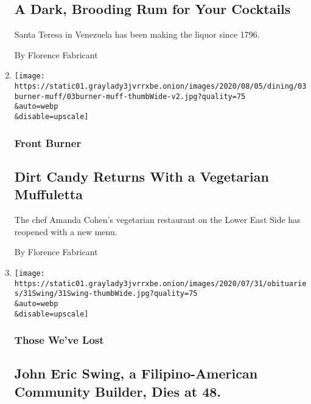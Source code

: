 \begin{enumerate}
  \hypertarget{a-dark-brooding-rum-for-your-cocktails}{%
  \subsection{A Dark, Brooding Rum for Your
  Cocktails}\label{a-dark-brooding-rum-for-your-cocktails}}

  Santa Teresa in Venezuela has been making the liquor since 1796.

  By Florence Fabricant
\item
  \href{/2020/08/03/dining/dirt-candy-vegetarian-muffuletta.html}{}

  \texttt{[image: https://static01.graylady3jvrrxbe.onion/images/2020/08/05/dining/03burner-muff/03burner-muff-thumbWide-v2.jpg?quality=75\\\&auto=webp\\\&disable=upscale]}

  \hypertarget{front-burner-6}{%
  \subsubsection{Front Burner}\label{front-burner-6}}

  \hypertarget{dirt-candy-returns-with-a-vegetarian-muffuletta}{%
  \subsection{Dirt Candy Returns With a Vegetarian
  Muffuletta}\label{dirt-candy-returns-with-a-vegetarian-muffuletta}}

  The chef Amanda Cohen's vegetarian restaurant on the Lower East Side
  has reopened with a new menu.

  By Florence Fabricant
\item
  \href{/2020/08/03/obituaries/john-swing-dead-coronavirus.html}{}

  \texttt{[image: https://static01.graylady3jvrrxbe.onion/images/2020/07/31/obituaries/31Swing/31Swing-thumbWide.jpg?quality=75\\\&auto=webp\\\&disable=upscale]}

  \hypertarget{those-weve-lost}{%
  \subsubsection{Those We've Lost}\label{those-weve-lost}}

  \hypertarget{john-eric-swing-a-filipino-american-community-builder-dies-at-48}{%
  \subsection{John Eric Swing, a Filipino-American Community Builder,
  Dies at
  48.}\label{john-eric-swing-a-filipino-american-community-builder-dies-at-48}}


\end{enumerate}
